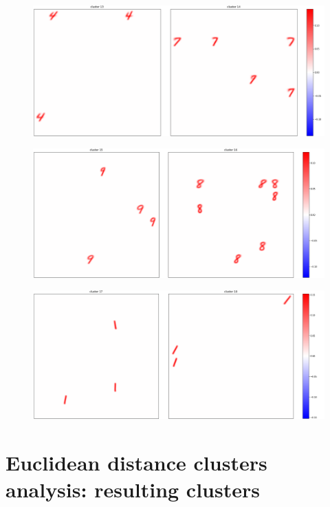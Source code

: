 \documentclass[a4paper]{report}
\begin{document}
\begin{figure} [H]
    \centering
    \includegraphics [width=\textwidth ] {c/h/13.png}
    \caption{}
\end{figure}

\begin{figure} [H]
    \centering
    \includegraphics [width=\textwidth ] {c/h/15.png}
    \caption{}
\end{figure}

\begin{figure} [H]
    \centering
    \includegraphics [width=\textwidth ] {c/h/17.png}
    \caption{}
\end{figure}

\chapter{Euclidean distance clusters analysis: resulting clusters}
\end{document}
